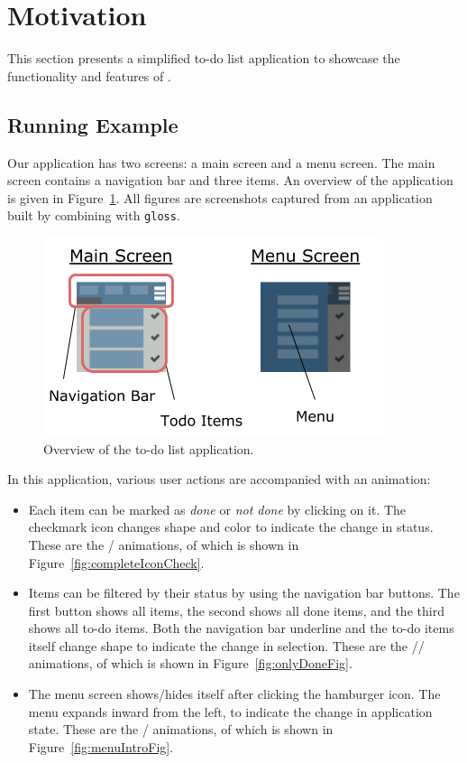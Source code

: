 \section{Motivation}
\label{sec:motivation}

This section presents a simplified to-do list application to showcase the
functionality and features of \dsl{}.

\subsection{Running Example}

Our application has two screens: a main screen and a menu screen. The main screen contains a navigation bar and three items. An overview of the application is given in Figure~\ref{fig:appOverview}. All figures are screenshots captured from an application built by combining \dsl{} with \texttt{gloss}.

\begin{figure}[!htbp]
\centering
\includegraphics[width=\figscale\textwidth]{pictures/app_overview}
\caption{Overview of the to-do list application.}
\label{fig:appOverview}
\end{figure}

In this application, various user actions are accompanied with an animation:
\begin{itemize}
\item Each item can be marked as \emph{done} or \emph{not done} by clicking on it. The
checkmark icon changes shape and color to indicate the change in status. These
are the / animations, of which  is
shown in Figure~\ref{fig:completeIconCheck}.
\item Items can be filtered by their status by using the navigation bar
buttons. The first button shows all items, the second shows all done items, and
the third shows all to-do items. Both the navigation bar underline and the
to-do items itself change shape to indicate the change in selection. These are
the // animations, of which
 is shown in Figure~\ref{fig:onlyDoneFig}.
\item The menu screen shows/hides itself after clicking the hamburger icon. The
menu expands inward from the left, to indicate the change in application state.
These are the / animations, of which 
is shown in Figure~\ref{fig:menuIntroFig}.
\end{itemize}

